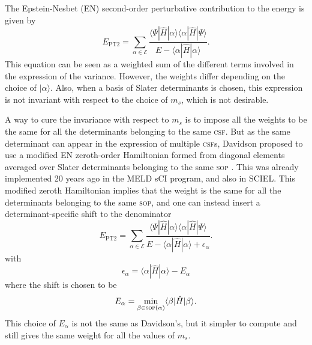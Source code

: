 \documentclass[aip,jcp,reprint,showkeys]{revtex4-1}
\newcommand{\ket}[1]{|#1\rangle}
\newcommand{\sop}{\textsc{sop}}
\newcommand{\csf}{\textsc{csf}}
\newcommand{\mel}[3]{\langle #1 | #2 | #3 \rangle}
\newcommand{\ept}{E_\text{PT2}}
\begin{document}
The Epstein-Nesbet (EN) second-order perturbative contribution to the energy is given
by
\begin{equation}
\ept = \sum_{\alpha \in \mathcal{E}} \frac{\mel{\Psi}{\hat{H}}{\alpha}\mel{\alpha}{\hat{H}}{\Psi}}{E-\mel{\alpha}{\hat{H}}{\alpha}}.
\label{eq:pt2}
\end{equation}
This equation can be seen as a weighted sum of the different terms involved in
the expression of the variance. However, the weights differ depending on the
choice of $\ket{\alpha}$. Also, when a basis of Slater determinants is chosen,
this expression is not invariant with respect to the choice of $m_s$, which
is not desirable.

A way to cure the invariance with respect to $m_s$ is to impose all the weights
to be the same for all the determinants belonging to the same \csf . But as 
the same determinant can appear in the expression of multiple \csf s, Davidson
proposed to use a modified EN zeroth-order Hamiltonian formed from
diagonal elements averaged over Slater determinants belonging to the same
\sop{} . This was already implemented 20 years ago in the MELD
sCI program,\cite{Davidson_1979,Kozlowski_1994} and also in 
SCIEL.\cite{Sciel}
This modified zeroth Hamiltonian implies that the weight is the same for all the
determinants belonging to the same \sop , and one can instead insert a
determinant-specific shift to the denominator 
\begin{equation}
\ept = \sum_{\alpha \in \mathcal{E}} \frac{\mel{\Psi}{\hat{H}}{\alpha}\mel{\alpha}{\hat{H}}{\Psi}}{E-\mel{\alpha}{\hat{H}}{\alpha}+\epsilon_\alpha}.
\end{equation}
with
\begin{equation}
\epsilon_\alpha = \mel{\alpha}{\hat{H}}{\alpha} - E_\alpha
\end{equation}
where the shift is chosen to be
\begin{equation}
E_\alpha = \min_{\beta \in \text{\sop}(\alpha)} \mel{\beta}{\hat{H}}{\beta}.
\end{equation}
This choice of $E_\alpha$ is not the same as Davidson's, but it simpler to compute
and still gives the same weight for all the values of $m_s$.
\end{document}
